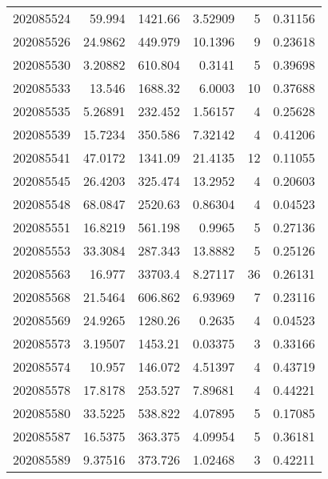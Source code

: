 \begin{tabular}{rrrrrr}
 202085524 &         59.994   &     1421.66   &            3.52909 &           5 & 0.31156 \\
 202085526 &         24.9862  &      449.979  &           10.1396  &           9 & 0.23618 \\
 202085530 &          3.20882 &      610.804  &            0.3141  &           5 & 0.39698 \\
 202085533 &         13.546   &     1688.32   &            6.0003  &          10 & 0.37688 \\
 202085535 &          5.26891 &      232.452  &            1.56157 &           4 & 0.25628 \\
 202085539 &         15.7234  &      350.586  &            7.32142 &           4 & 0.41206 \\
 202085541 &         47.0172  &     1341.09   &           21.4135  &          12 & 0.11055 \\
 202085545 &         26.4203  &      325.474  &           13.2952  &           4 & 0.20603 \\
 202085548 &         68.0847  &     2520.63   &            0.86304 &           4 & 0.04523 \\
 202085551 &         16.8219  &      561.198  &            0.9965  &           5 & 0.27136 \\
 202085553 &         33.3084  &      287.343  &           13.8882  &           5 & 0.25126 \\
 202085563 &         16.977   &    33703.4    &            8.27117 &          36 & 0.26131 \\
 202085568 &         21.5464  &      606.862  &            6.93969 &           7 & 0.23116 \\
 202085569 &         24.9265  &     1280.26   &            0.2635  &           4 & 0.04523 \\
 202085573 &          3.19507 &     1453.21   &            0.03375 &           3 & 0.33166 \\
 202085574 &         10.957   &      146.072  &            4.51397 &           4 & 0.43719 \\
 202085578 &         17.8178  &      253.527  &            7.89681 &           4 & 0.44221 \\
 202085580 &         33.5225  &      538.822  &            4.07895 &           5 & 0.17085 \\
 202085587 &         16.5375  &      363.375  &            4.09954 &           5 & 0.36181 \\
 202085589 &          9.37516 &      373.726  &            1.02468 &           3 & 0.42211 \\

\end{tabular}
